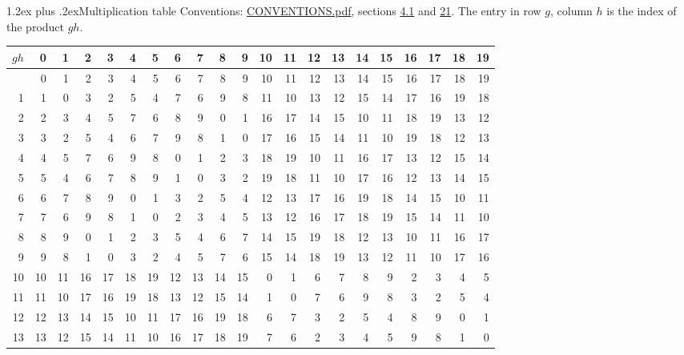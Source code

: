 \documentclass[10pt,a4paper]{article}
\makeatletter
\renewcommand\section{\@startsection{section}{1}{\z@}{-3ex plus -1ex minus -.2ex}%
  {1.2ex plus .2ex}{\normalfont\large\sffamily\bfseries\color{parttitle}}}
\numberwithin{equation}{section}
\makeatother
\begin{document}
\section{Multiplication table}\label{s:multiplication}
Conventions: \href{../../CONVENTIONS.pdf}{CONVENTIONS.pdf}, sections \href{../../../rotation/CONVENTIONS.pdf\#conv.4.1}{4.1} and \href{../../CONVENTIONS.pdf\#conv.21}{21}.
The entry in row $g$, column $h$ is the index of the product $gh$.
{\normalsize\setlength{\tabcolsep}{0.1em}\setlength{\LTleft}{-8pt plus 1fill}\setlength{\LTright}{-8pt plus 1fill}\begin{longtable}{@{}r|rrrrrrrrrrrrrrrrrrrr@{}}\toprule
$gh$ & 0 & 1 & 2 & 3 & 4 & 5 & 6 & 7 & 8 & 9 & 10 & 11 & 12 & 13 & 14 & 15 & 16 & 17 & 18 & 19\\\midrule\endhead
\bottomrule\endfoot\endlastfoot
0 & 0 & 1 & 2 & 3 & 4 & 5 & 6 & 7 & 8 & 9 & 10 & 11 & 12 & 13 & 14 & 15 & 16 & 17 & 18 & 19\\*
1 & 1 & 0 & 3 & 2 & 5 & 4 & 7 & 6 & 9 & 8 & 11 & 10 & 13 & 12 & 15 & 14 & 17 & 16 & 19 & 18\\
2 & 2 & 3 & 4 & 5 & 7 & 6 & 8 & 9 & 0 & 1 & 16 & 17 & 14 & 15 & 10 & 11 & 18 & 19 & 13 & 12\\
3 & 3 & 2 & 5 & 4 & 6 & 7 & 9 & 8 & 1 & 0 & 17 & 16 & 15 & 14 & 11 & 10 & 19 & 18 & 12 & 13\\
4 & 4 & 5 & 7 & 6 & 9 & 8 & 0 & 1 & 2 & 3 & 18 & 19 & 10 & 11 & 16 & 17 & 13 & 12 & 15 & 14\\
5 & 5 & 4 & 6 & 7 & 8 & 9 & 1 & 0 & 3 & 2 & 19 & 18 & 11 & 10 & 17 & 16 & 12 & 13 & 14 & 15\\
6 & 6 & 7 & 8 & 9 & 0 & 1 & 3 & 2 & 5 & 4 & 12 & 13 & 17 & 16 & 19 & 18 & 14 & 15 & 10 & 11\\
7 & 7 & 6 & 9 & 8 & 1 & 0 & 2 & 3 & 4 & 5 & 13 & 12 & 16 & 17 & 18 & 19 & 15 & 14 & 11 & 10\\
8 & 8 & 9 & 0 & 1 & 2 & 3 & 5 & 4 & 6 & 7 & 14 & 15 & 19 & 18 & 12 & 13 & 10 & 11 & 16 & 17\\
9 & 9 & 8 & 1 & 0 & 3 & 2 & 4 & 5 & 7 & 6 & 15 & 14 & 18 & 19 & 13 & 12 & 11 & 10 & 17 & 16\\
10 & 10 & 11 & 16 & 17 & 18 & 19 & 12 & 13 & 14 & 15 & 0 & 1 & 6 & 7 & 8 & 9 & 2 & 3 & 4 & 5\\
11 & 11 & 10 & 17 & 16 & 19 & 18 & 13 & 12 & 15 & 14 & 1 & 0 & 7 & 6 & 9 & 8 & 3 & 2 & 5 & 4\\
12 & 12 & 13 & 14 & 15 & 10 & 11 & 17 & 16 & 19 & 18 & 6 & 7 & 3 & 2 & 5 & 4 & 8 & 9 & 0 & 1\\
13 & 13 & 12 & 15 & 14 & 11 & 10 & 16 & 17 & 18 & 19 & 7 & 6 & 2 & 3 & 4 & 5 & 9 & 8 & 1 & 0\\

\end{longtable}}
\end{document}
